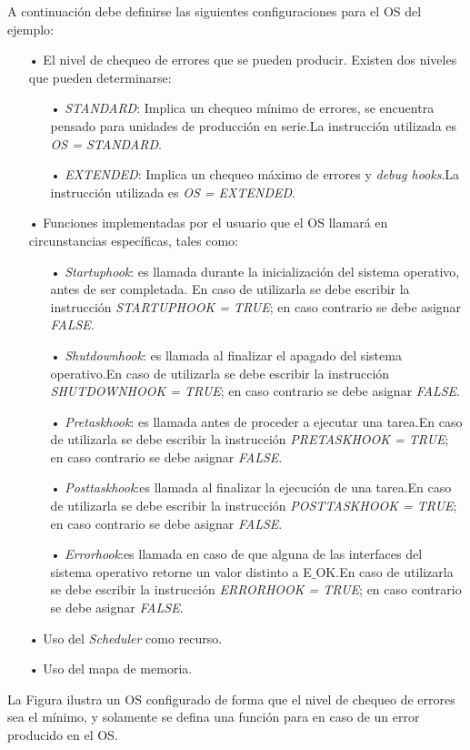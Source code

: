 \documentclass[12pt,letterpaper]{article}
\begin{document}
A continuación debe definirse las siguientes configuraciones para el OS del ejemplo:

\begin{enumerate}
\item[•]El nivel de chequeo de errores que se pueden producir. Existen dos niveles que pueden determinarse:
\begin{enumerate}
\item[•]\textit{STANDARD}: Implica un chequeo mínimo de errores, se encuentra pensado para unidades de producción en serie.La instrucción utilizada es \textit{OS = STANDARD}. 
\item[•]\textit{EXTENDED}: Implica un chequeo máximo de errores y \textit{debug hooks}.La instrucción utilizada es \textit{OS = EXTENDED}.
\end{enumerate}
\item[•]Funciones implementadas por el usuario que el OS llamará en circunstancias específicas, tales como:
\begin{enumerate}
\item[•]\textit{Startuphook}: es  llamada  durante  la  inicialización  del  sistema  operativo,  antes  de  ser completada. En caso de utilizarla se debe escribir la instrucción \textit{STARTUPHOOK = TRUE}; en caso contrario se debe asignar \textit{FALSE}.
\item[•]\textit{Shutdownhook}: es llamada al finalizar el apagado del sistema operativo.En caso de utilizarla se debe escribir la instrucción \textit{SHUTDOWNHOOK = TRUE}; en caso contrario se debe asignar \textit{FALSE}.
\item[•]\textit{Pretaskhook}: es llamada antes de proceder a ejecutar una tarea.En caso de utilizarla se debe escribir la instrucción \textit{PRETASKHOOK = TRUE}; en caso contrario se debe asignar \textit{FALSE}.
\item[•]\textit{Posttaskhook}:es llamada al finalizar la ejecución de una tarea.En caso de utilizarla se debe escribir la instrucción \textit{POSTTASKHOOK = TRUE}; en caso contrario se debe asignar \textit{FALSE}.
\item[•]\textit{Errorhook}:es llamada en caso de que alguna de las interfaces del sistema operativo retorne un valor distinto a E$\_$OK.En caso de utilizarla se debe escribir la instrucción \textit{ERRORHOOK = TRUE}; en caso contrario se debe asignar \textit{FALSE}.
\end{enumerate}
\item[•]Uso del \textit{Scheduler} como recurso.
\item[•]Uso del mapa de memoria.
\end{enumerate}
La Figura  ilustra un OS configurado de forma que el nivel de chequeo de errores sea el mínimo, y solamente se defina una función para en caso de un error producido en el OS.
\end{document}
